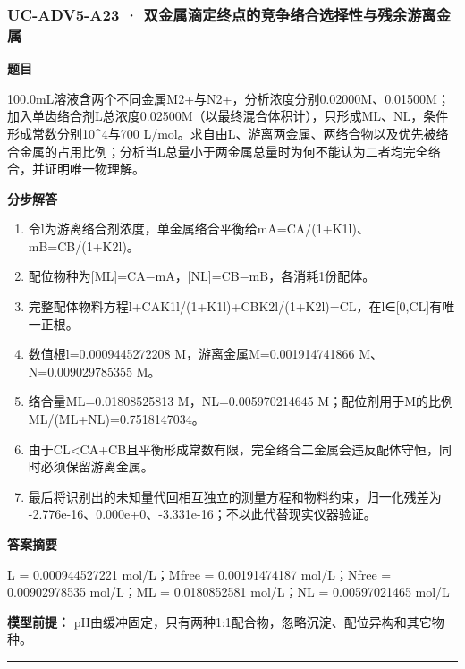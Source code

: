 \documentclass[UTF8,11pt,a4paper]{ctexart}
\begin{document}
\subsubsection*{UC-ADV5-A23 · 双金属滴定终点的竞争络合选择性与残余游离金属}
\noindent\textbf{题目}\par
100.0mL溶液含两个不同金属M2+与N2+，分析浓度分别0.02000M、0.01500M；加入单齿络合剂L总浓度0.02500M（以最终混合体积计），只形成ML、NL，条件形成常数分别10\textasciicircum{}4与700 L/mol。求自由L、游离两金属、两络合物以及优先被络合金属的占用比例；分析当L总量小于两金属总量时为何不能认为二者均完全络合，并证明唯一物理解。\par
\medskip\noindent\textbf{分步解答}
\begin{enumerate}
\item 令l为游离络合剂浓度，单金属络合平衡给mA=CA/(1+K1l)、mB=CB/(1+K2l)。
\item 配位物种为[ML]=CA−mA，[NL]=CB−mB，各消耗1份配体。
\item 完整配体物料方程l+CAK1l/(1+K1l)+CBK2l/(1+K2l)=CL，在l∈[0,CL]有唯一正根。
\item 数值根l=0.0009445272208 M，游离金属M=0.001914741866 M、N=0.009029785355 M。
\item 络合量ML=0.01808525813 M，NL=0.005970214645 M；配位剂用于M的比例ML/(ML+NL)=0.7518147034。
\item 由于CL<CA+CB且平衡形成常数有限，完全络合二金属会违反配体守恒，同时必须保留游离金属。
\item 最后将识别出的未知量代回相互独立的测量方程和物料约束，归一化残差为 -2.776e-16、0.000e+0、-3.331e-16；不以此代替现实仪器验证。
\end{enumerate}
\noindent\textbf{答案摘要}\par
L = 0.000944527221 mol/L；Mfree = 0.00191474187 mol/L；Nfree = 0.00902978535 mol/L；ML = 0.0180852581 mol/L；NL = 0.00597021465 mol/L\par
\noindent\textbf{模型前提：}
pH由缓冲固定，只有两种1:1配合物，忽略沉淀、配位异构和其它物种。\par
\medskip\hrule\medskip
{}
\end{document}
